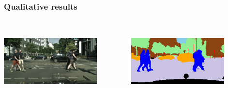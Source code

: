 \documentclass[10pt,xcolor=pdflatex,hyperref={unicode}]{beamer}
\begin{document}
\begin{frame}\frametitle{Qualitative results}
    \begin{columns}[T]
        \begin{column}{.5\textwidth}
            \includegraphics[width=2in,height=1.5in]{img/frankfurt_000000_014480_leftImg8bit.png}\centering
        \end{column}
        \begin{column}{.5\textwidth}
            \includegraphics[width=2in,height=1.5in]{img/seg_33.png}\centering
        \end{column}
    \end{columns}
\end{frame}

\end{document}
